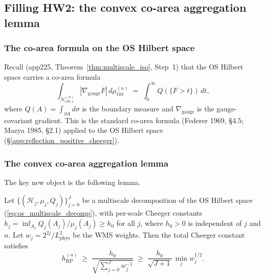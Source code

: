 \subsection{Filling HW2: the convex co-area aggregation lemma}
\label{ssec:fill_hw2}

\subsubsection{The co-area formula on the OS Hilbert space}

Recall (app225, Theorem~\ref{thm:multiscale_iso}, Step~1) that
the OS Hilbert space carries a co-area formula
\begin{equation}
\label{eq:coarea_os}
  \int_{\mathcal{H}_{\mathrm{OS},1}^{(n)}}|\nabla_{\mathrm{gauge}}
  F|\,d\mu_{\mathrm{OS}}^{(n)}
  \;=\;\int_{0}^{\infty}Q(\{F>t\})\,dt,
\end{equation}
where $Q(A)=\int_{\partial A}d\sigma$ is the boundary measure and
$\nabla_{\mathrm{gauge}}$ is the gauge-covariant gradient. This is
the standard co-area formula (Federer 1969, \S 4.5; Mazya 1985,
\S 2.1) applied to the OS Hilbert space
(\S\ref{app:reflection_positive_cheeger}).

\subsubsection{The convex co-area aggregation lemma}

The key new object is the following lemma.

\begin{lemma}
\label{lem:convex_coarea_aggregation}
Let $\{(\mathcal{H}_{j},\mu_{j},Q_{j})\}_{j=0}^{J}$ be a
multiscale decomposition of the OS Hilbert space
(\eqref{eq:os_multiscale_decomp}), with per-scale Cheeger
constants $h_{j}=\inf_{A_{j}}Q_{j}(A_{j})/\mu_{j}(A_{j})\ge h_{0}$
for all $j$, where $h_{0}>0$ is independent of $j$ and $n$. Let
$w_{j}=2^{2j}/L_{\mathrm{phys}}^{2}$ be the WMS weights. Then the
total Cheeger constant satisfies
\begin{equation}
\label{eq:convex_coarea}
  h_{\mathrm{RP}}^{(n)}
  \;\ge\;\frac{h_{0}}{\sqrt{\sum_{j=0}^{J}w_{j}^{-1}}}
  \;\ge\;\frac{h_{0}}{\sqrt{J+1}}\,\min_{j}w_{j}^{1/2}.
\end{equation}
\end{lemma}

